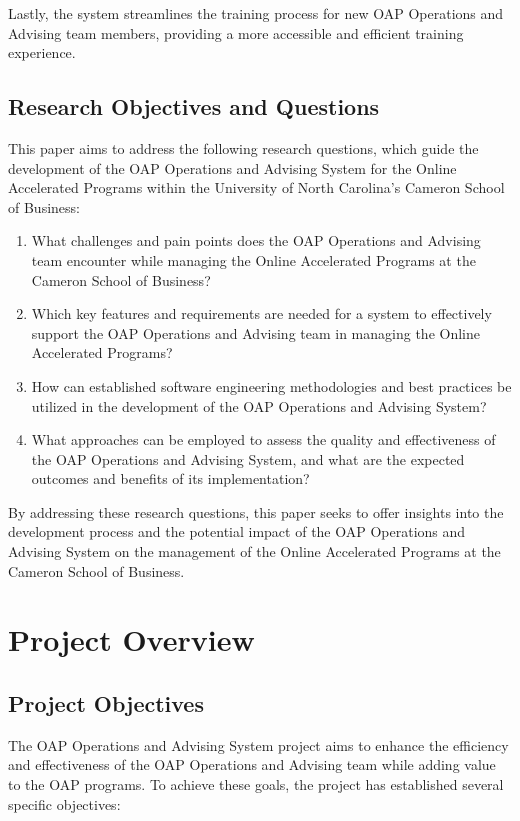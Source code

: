 \documentclass[12pt]{article}
\begin{document}
Lastly, the system streamlines the training process for new OAP Operations and Advising team members, providing a more accessible and efficient training experience.

\subsection{Research Objectives and Questions}
This paper aims to address the following research questions, which guide the development of the OAP Operations and Advising System for the Online Accelerated Programs within the University of North Carolina's Cameron School of Business:

\begin{enumerate}[label=(\roman*)]
    \item What challenges and pain points does the OAP Operations and Advising team encounter while managing the Online Accelerated Programs at the Cameron School of Business?
    \item Which key features and requirements are needed for a system to effectively support the OAP Operations and Advising team in managing the Online Accelerated Programs?
    \item How can established software engineering methodologies and best practices be utilized in the development of the OAP Operations and Advising System?
    \item What approaches can be employed to assess the quality and effectiveness of the OAP Operations and Advising System, and what are the expected outcomes and benefits of its implementation?
\end{enumerate}

By addressing these research questions, this paper seeks to offer insights into the development process and the potential impact of the OAP Operations and Advising System on the management of the Online Accelerated Programs at the Cameron School of Business.

\section{Project Overview}
\subsection{Project Objectives}
The OAP Operations and Advising System project aims to enhance the efficiency and effectiveness of the OAP Operations and Advising team while adding value to the OAP programs. To achieve these goals, the project has established several specific objectives:
\end{document}
